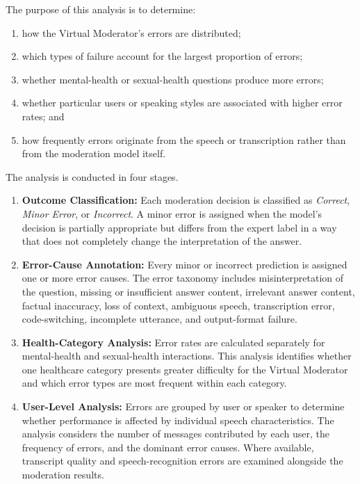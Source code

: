 \documentclass[11pt,a4paper]{article}
\begin{document}
The purpose of this analysis is to determine:

\begin{enumerate}[nosep]
    \item how the Virtual Moderator's errors are distributed;
    \item which types of failure account for the largest proportion of errors;
    \item whether mental-health or sexual-health questions produce more errors;
    \item whether particular users or speaking styles are associated with
    higher error rates; and
    \item how frequently errors originate from the speech or transcription
    rather than from the moderation model itself.
\end{enumerate}

The analysis is conducted in four stages.

\begin{enumerate}[nosep]
    \item \textbf{Outcome Classification:}
    Each moderation decision is classified as \emph{Correct},
    \emph{Minor Error}, or \emph{Incorrect}. A minor error is assigned when
    the model's decision is partially appropriate but differs from the expert
    label in a way that does not completely change the interpretation of the
    answer.

    \item \textbf{Error-Cause Annotation:}
    Every minor or incorrect prediction is assigned one or more error causes.
    The error taxonomy includes misinterpretation of the question, missing or
    insufficient answer content, irrelevant answer content, factual
    inaccuracy, loss of context, ambiguous speech, transcription error,
    code-switching, incomplete utterance, and output-format failure.

    \item \textbf{Health-Category Analysis:}
    Error rates are calculated separately for mental-health and sexual-health
    interactions. This analysis identifies whether one healthcare category
    presents greater difficulty for the Virtual Moderator and which error types
    are most frequent within each category.

    \item \textbf{User-Level Analysis:}
    Errors are grouped by user or speaker to determine whether performance is
    affected by individual speech characteristics. The analysis considers the
    number of messages contributed by each user, the frequency of errors, and
    the dominant error causes. Where available, transcript quality and
    speech-recognition errors are examined alongside the moderation results.
\end{enumerate}
\end{document}
